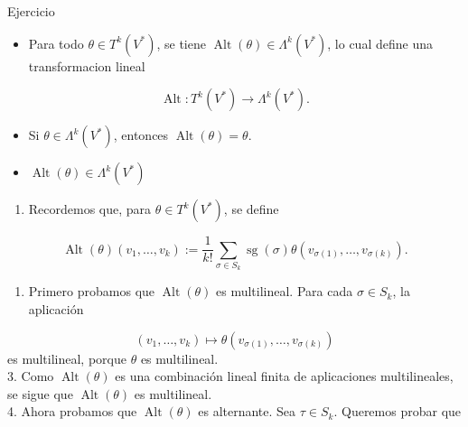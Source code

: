 \begin{bookproposition}{Ejercicio}
\begin{itemize}
\item Para todo $\theta\in T^k(V^*)$, se tiene $\operatorname{Alt}(\theta)\in\Lambda^k(V^*)$, lo cual define una transformacion lineal
\end{itemize}
\[
\operatorname{Alt}:T^k(V^*)\to\Lambda^k(V^*).
\]
\begin{itemize}
\item Si $\theta\in\Lambda^k(V^*)$, entonces $\operatorname{Alt}(\theta)=\theta$.
\end{itemize}
\end{bookproposition}
\begin{bookproof}{}
\begin{itemize}
\item $\operatorname{Alt}(\theta)\in\Lambda^k(V^*)$
\end{itemize}
\begin{enumerate}
\item Recordemos que, para $\theta\in T^k(V^*)$, se define
\end{enumerate}
\[
\operatorname{Alt}(\theta)(v_1,\dots,v_k):=\frac{1}{k!}\sum_{\sigma\in S_k}\operatorname{sg}(\sigma)\theta(v_{\sigma(1)},\dots,v_{\sigma(k)}).
\]
\begin{enumerate}[start=2]
\item Primero probamos que $\operatorname{Alt}(\theta)$ es multilineal. Para cada $\sigma\in S_k$, la aplicación
\end{enumerate}
\[
(v_1,\dots,v_k)\mapsto \theta(v_{\sigma(1)},\dots,v_{\sigma(k)})
\]
es multilineal, porque $\theta$ es multilineal.\\
3. Como $\operatorname{Alt}(\theta)$ es una combinación lineal finita de aplicaciones multilineales, se sigue que $\operatorname{Alt}(\theta)$ es multilineal.\\
4. Ahora probamos que $\operatorname{Alt}(\theta)$ es alternante. Sea $\tau\in S_k$. Queremos probar que


\end{bookproof}
